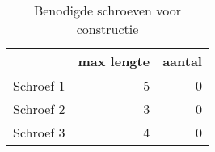 \begin{table}[h!]
\centering
\caption{Benodigde schroeven voor constructie}
\begin{tabular}{lrr}
\toprule
{} &  max lengte &  aantal \\
\midrule
Schroef 1 &           5 &       0 \\
Schroef 2 &           3 &       0 \\
Schroef 3 &           4 &       0 \\
\bottomrule
\end{tabular}
\end{table}
